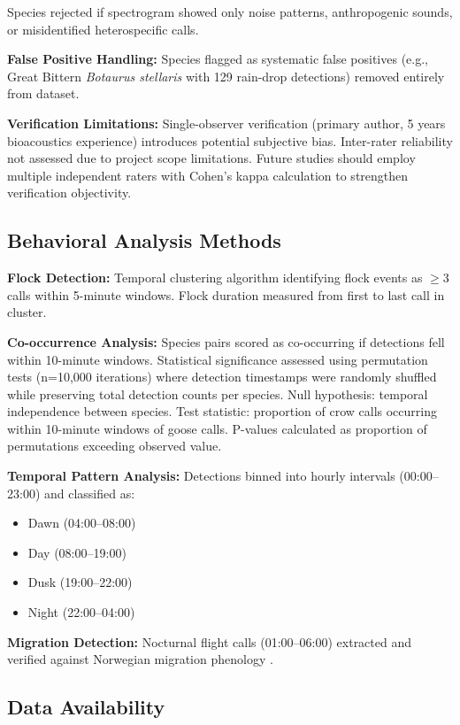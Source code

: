 \documentclass[twocolumn]{article}
\begin{document}
Species rejected if spectrogram showed only noise patterns, anthropogenic sounds, or misidentified heterospecific calls.

\textbf{False Positive Handling:} Species flagged as systematic false positives (e.g., Great Bittern \textit{Botaurus stellaris} with 129 rain-drop detections) removed entirely from dataset.

\textbf{Verification Limitations:} Single-observer verification (primary author, 5 years bioacoustics experience) introduces potential subjective bias. Inter-rater reliability not assessed due to project scope limitations. Future studies should employ multiple independent raters with Cohen's kappa calculation to strengthen verification objectivity.

\subsection{Behavioral Analysis Methods}

\textbf{Flock Detection:} Temporal clustering algorithm identifying flock events as $\geq$3 calls within 5-minute windows. Flock duration measured from first to last call in cluster.

\textbf{Co-occurrence Analysis:} Species pairs scored as co-occurring if detections fell within 10-minute windows. Statistical significance assessed using permutation tests (n=10,000 iterations) where detection timestamps were randomly shuffled while preserving total detection counts per species. Null hypothesis: temporal independence between species. Test statistic: proportion of crow calls occurring within 10-minute windows of goose calls. P-values calculated as proportion of permutations exceeding observed value.

\textbf{Temporal Pattern Analysis:} Detections binned into hourly intervals (00:00--23:00) and classified as:
\begin{itemize}
\item Dawn (04:00--08:00)
\item Day (08:00--19:00)
\item Dusk (19:00--22:00)
\item Night (22:00--04:00)
\end{itemize}

\textbf{Migration Detection:} Nocturnal flight calls (01:00--06:00) extracted and verified against Norwegian migration phenology \citep{Shimmings2016}.

\subsection{Data Availability}
\end{document}
